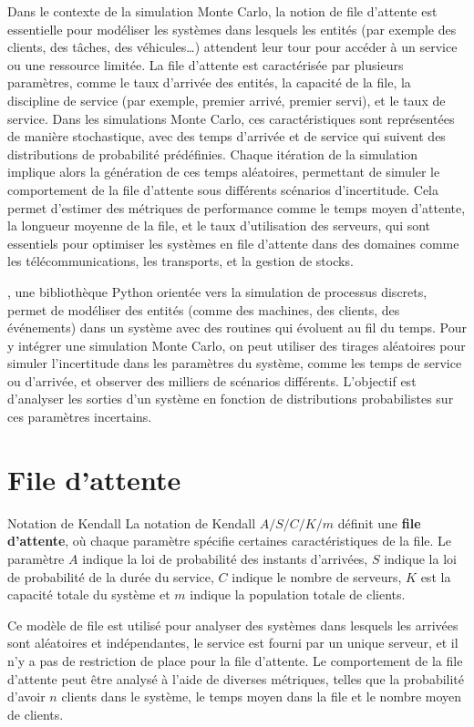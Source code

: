         Dans le contexte de la simulation Monte Carlo, la notion de file d'attente est essentielle pour modéliser les systèmes dans lesquels les entités (par exemple des clients, des tâches, des véhicules…) attendent leur tour pour accéder à un service ou une ressource limitée. La file d'attente est caractérisée par plusieurs paramètres, comme le taux d'arrivée des entités, la capacité de la file, la discipline de service (par exemple, premier arrivé, premier servi), et le taux de service. Dans les simulations Monte Carlo, ces caractéristiques sont représentées de manière stochastique, avec des temps d'arrivée et de service qui suivent des distributions de probabilité prédéfinies. Chaque itération de la simulation implique alors la génération de ces temps aléatoires, permettant de simuler le comportement de la file d'attente sous différents scénarios d'incertitude. Cela permet d'estimer des métriques de performance comme le temps moyen d'attente, la longueur moyenne de la file, et le taux d'utilisation des serveurs, qui sont essentiels pour optimiser les systèmes en file d'attente dans des domaines comme les télécommunications, les transports, et la gestion de stocks.
    
        , une bibliothèque Python orientée vers la simulation de processus discrets, permet de modéliser des entités (comme des machines, des clients, des événements) dans un système avec des routines qui évoluent au fil du temps. Pour y intégrer une simulation Monte Carlo, on peut utiliser des tirages aléatoires pour simuler l'incertitude dans les paramètres du système, comme les temps de service ou d'arrivée, et observer des milliers de scénarios différents. L’objectif est d’analyser les sorties d’un système en fonction de distributions probabilistes sur ces paramètres incertains.

    \section{File d'attente}
        \begin{definition}{Notation de Kendall}
            La notation de Kendall $A/S/C/K/m$ définit une \textbf{file d'attente}, où chaque paramètre spécifie certaines caractéristiques de la file. Le paramètre $A$ indique la loi de probabilité des instants d'arrivées, $S$ indique la loi de probabilité de la durée du service, $C$ indique le nombre de serveurs, $K$ est la capacité totale du système et $m$ indique la population totale de clients.
        \end{definition}
        Ce modèle de file est utilisé pour analyser des systèmes dans lesquels les arrivées sont aléatoires et indépendantes, le service est fourni par un unique serveur, et il n'y a pas de restriction de place pour la file d'attente. Le comportement de la file d'attente peut être analysé à l'aide de diverses métriques, telles que la probabilité d'avoir $n$ clients dans le système, le temps moyen dans la file et le nombre moyen de clients.

